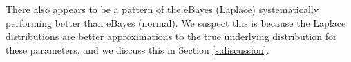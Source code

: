 \documentclass[useAMS,usenatbib,referee]{biom}
\begin{document}
There also appears to be a pattern of the eBayes (Laplace) systematically performing better than eBayes (normal). We suspect this is because the Laplace distributions are better approximations to the true underlying distribution for these parameters, and we discuss this in Section \ref{s:discussion}.

% 
% 
% 
\end{document}
